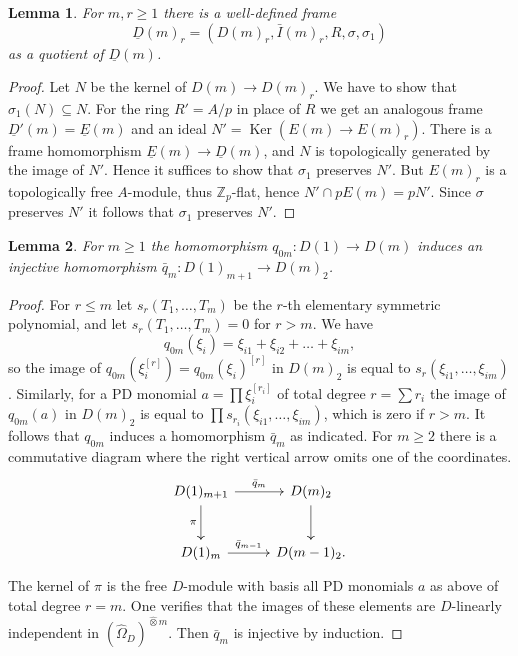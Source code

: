 \documentclass[a4paper,11pt]{article}
\theoremstyle{plain}
\newtheorem{Lemma}{Lemma}
\theoremstyle{definition}
\theoremstyle{remark}
\theoremstyle{definition}
\numberwithin{Lemma}{section}
\numberwithin{Subpoint}{Lemma}
\numberwithin{equation}{section}
\newcommand{\ZZ}{{\mathbb{Z}}}
\DeclareMathOperator{\Ker}{Ker}
\renewcommand{\u}{\underline}
\newcommand{\chang}[1]{{#1}}
\begin{document}
\begin{Lemma}
For $m,r\ge 1$ there is a well-defined frame 
\[
\u D(m)_r=(D(m)_r,\bar I(m)_r,R,\sigma,\sigma_1)
\]
as a quotient of $\u D(m)$.
\end{Lemma}

\begin{proof}
Let $N$ be the kernel of $D(m)\to D(m)_r$. 
We have to show that $\sigma_1(N)\subseteq N$.
For the ring $R'=A/p$ in place of $R$
we get an analogous frame $\u D'(m)=\u E(m)$
and an ideal $N'=\Ker(E(m)\to E(m)_r)$. 
There is a frame homomorphism $\u E(m)\to\u D(m)$,
and $N$ is topologically generated by the image of $N'$.
Hence it suffices to show that $\sigma_1$ preserves $N'$.
But $E(m)_r$ is a topologically free $A$-module, thus $\ZZ_p$-flat, 
hence $N'\cap pE(m)=pN'$. Since $\sigma$ preserves $N'$
it follows that $\sigma_1$ preserves $N'$.
\end{proof}

\begin{Lemma}
\label{Le:D1mDm2}
For $m\ge 1$ 
the homomorphism \chang{$q_{0m}:D(1)\to D(m)$} induces an injective homomorphism
\chang{$\bar q_m:D(1)_{m+1}\to D(m)_2$}.
\end{Lemma}

\begin{proof}
\chang{For $r\le m$ let $s_r(T_1,\ldots,T_m)$ be the $r$-th elementary symmetric polynomial, and let $s_r(T_1,\ldots,T_m)=0$ for $r>m$. 
We have 
\[
q_{0m}(\xi_i)=\xi_{i1}+\xi_{i2}+\ldots+\xi_{im},
\]
so the image of $q_{0m}(\xi_i^{[r]})=q_{0m}(\xi_i)^{[r]}$ in $D(m)_2$ 
is equal to $s_r(\xi_{i1},\ldots,\xi_{im})$.
Similarly, 
for a PD monomial $a=\prod\xi_i^{[r_i]}$ 
of total degree $r=\sum r_i$ the image of
$q_{0m}(a)$ in $D(m)_2$ is equal to $\prod s_{r_i}(\xi_{i1},\ldots,\xi_{im})$,
which is zero if $r>m$. 
It follows that $q_{0m}$ induces a homomorphism $\bar q_m$ as indicated.
For $m\ge 2$ there is a commutative diagram where the right vertical arrow omits one of the coordinates.
\[
\xymatrix@M+0.2em{
D(1)_{m+1} \ar[d]_\pi \ar[r]^-{\bar q_m} & D(m)_2 \ar[d] \\
D(1)_{m} \ar[r]^-{\bar q_{m-1}} & D(m-1)_2.
}
\]
The kernel of $\pi$ is the free $D$-module with basis all PD monomials $a$ as above of total degree $r=m$. One verifies that the images of these elements are $D$-linearly independent in $(\hat\Omega_D)^{\hat\otimes m}$. Then $\bar q_m$ is injective by induction.}
\end{proof}
\end{document}
